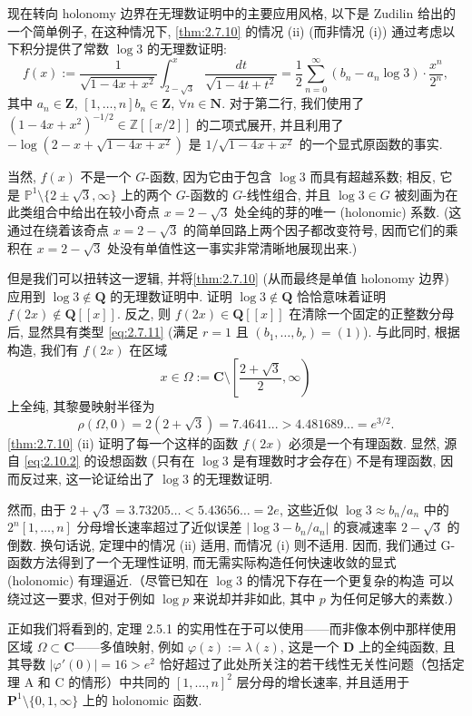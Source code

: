 \begin{remark}\label{rem:2.10.1}
现在转向 holonomy 边界在无理数证明中的主要应用风格, 以下是 Zudilin \cite[§ 3]{Zud17} 给出的一个简单例子, 在这种情况下, \autoref{thm:2.7.10} 的情况 (ii) (而非情况 (i)) 通过考虑以下积分提供了常数 \(\log 3\) 的无理数证明:
\begin{equation}\label{eq:2.10.2}
  f(x) := \frac{1}{\sqrt{1 - 4x + x^2}} \int_{2 - \sqrt{3}}^{x} \frac{dt}{\sqrt{1 - 4t + t^2}} = \frac{1}{2} \sum_{n=0}^{\infty} (b_n - a_n \log 3) \cdot \frac{x^n}{2^n},
\end{equation}
其中 \(a_n \in \mathbf{Z}\), \([1, \dots, n] b_n \in \mathbf{Z}\), \(\forall n \in \mathbf{N}\).
对于第二行, 我们使用了 \((1-4x+x^2)^{-1/2} \in \mathbb{Z}[\! [x/2]\!]\) 的二项式展开, 并且利用了 \(-\log(2-x+\sqrt{1-4x+x^2})\) 是 \(1/\sqrt{1-4x+x^2}\) 的一个显式原函数的事实.

当然, \(f(x)\) 不是一个 $G$-函数, 因为它由于包含 \(\log 3\) 而具有超越系数; 相反, 它是 \(\mathbb{P}^1 \setminus \{2 \pm \sqrt{3}, \infty\}\) 上的两个 $G$-函数的 $G$-线性组合, 并且 \(\log 3 \in G\) 被刻画为在此类组合中给出在较小奇点 \(x = 2 - \sqrt{3}\) 处全纯的芽的唯一 (holonomic) 系数. (这通过在绕着该奇点 \(x = 2 - \sqrt{3}\) 的简单回路上两个因子都改变符号, 因而它们的乘积在 \(x = 2 - \sqrt{3}\) 处没有单值性这一事实非常清晰地展现出来.)

但是我们可以扭转这一逻辑, 并将\autoref{thm:2.7.10} (从而最终是单值 holonomy 边界) 应用到 \(\log 3 \notin \mathbf{Q}\) 的无理数证明中. 证明 \(\log 3 \notin \mathbf{Q}\) 恰恰意味着证明 \(f(2x) \notin \mathbf{Q}[\! [x]\!]\). 反之, 则 \(f(2x) \in \mathbf{Q}[\! [x]\!]\) 在清除一个固定的正整数分母后, 显然具有类型 \eqref{eq:2.7.11} (满足 $r=1$ 且 \((b_1,\dots,b_r)=(1)\)). 与此同时, 根据构造, 我们有 \(f(2x)\) 在区域
\[ x \in \Omega := \mathbf{C} \setminus \left[ \frac{2 + \sqrt{3}}{2}, \infty \right) \]
上全纯, 其黎曼映射半径为
\[ \rho(\Omega, 0) = 2(2 + \sqrt{3}) = 7.4641... > 4.481689... = e^{3/2}. \]
\autoref{thm:2.7.10} (ii) 证明了每一个这样的函数 \(f(2x)\) 必须是一个有理函数. 显然, 源自 \eqref{eq:2.10.2} 的设想函数 (只有在 \(\log 3\) 是有理数时才会存在) 不是有理函数, 因而反过来, 这一论证给出了 \(\log 3\) 的无理数证明.

然而, 由于 \(2 + \sqrt{3} = 3.73205\dots < 5.43656\dots = 2e\), 这些近似 \(\log 3 \approx b_n/a_n\) 中的 \(2^n[1,\dots,n]\) 分母增长速率超过了近似误差 \(\lvert\log 3 - b_n/a_n\rvert\) 的衰减速率 \(2 - \sqrt{3}\) 的倒数. 换句话说, 定理中的情况 (ii) 适用, 而情况 (i) 则不适用. 因而, 我们通过 G-函数方法得到了一个无理性证明, 而无需实际构造任何快速收敛的显式 (holonomic) 有理逼近.（尽管已知在 \(\log 3\) 的情况下存在一个更复杂的构造 \cite{Sal07, Sor16} 可以绕过这一要求, 但对于例如 \(\log p\) 来说却并非如此, 其中 \(p\) 为任何足够大的素数.）

正如我们将看到的, 定理 2.5.1 的实用性在于可以使用——而非像本例中那样使用区域 \(\Omega \subset \mathbf{C}\)——多值映射, 例如 \(\varphi(z) := \lambda(z)\), 这是一个 \(\mathbf{D}\) 上的全纯函数, 且其导数 \(\lvert\varphi'(0)\rvert = 16 > e^2\) 恰好超过了此处所关注的若干线性无关性问题（包括定理 A 和 C 的情形）中共同的 \([1,\dots,n]^2\) 层分母的增长速率, 并且适用于 \(\mathbf{P}^1 \setminus \{0,1,\infty\}\) 上的 holonomic 函数.
\end{remark}

